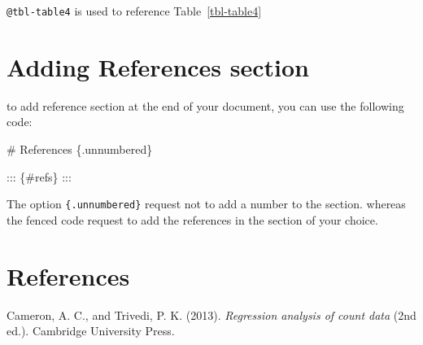 \documentclass[
  11pts,
]{article}
\newenvironment{Shaded}{\begin{snugshade}}{\end{snugshade}}
\newcommand{\FunctionTok}[1]{\textcolor[rgb]{0.28,0.35,0.67}{#1}}
\newcommand{\NormalTok}[1]{\textcolor[rgb]{0.00,0.23,0.31}{#1}}
\newlength{\cslhangindent}
\newenvironment{CSLReferences}[2] %
 {\begin{list}{}{%
  \setlength{\itemindent}{0pt}
  \setlength{\leftmargin}{0pt}
  \setlength{\parsep}{0pt}
  \ifodd #1
   \setlength{\leftmargin}{\cslhangindent}
   \setlength{\itemindent}{-1\cslhangindent}
  \fi
  \setlength{\itemsep}{#2\baselineskip}}}
 {\end{list}}
\begin{document}
\begin{table}[H]

\caption{\label{tbl-table4}Table using Latex code}


\end{table}%

\texttt{@tbl-table4} is used to reference Table~\ref{tbl-table4}

\section{Adding References section}\label{adding-references-section}

to add reference section at the end of your document, you can use the
following code:

\begin{Shaded}
\begin{Highlighting}[]
\FunctionTok{\# References \{.unnumbered\}}

\NormalTok{::: \{\#refs\}}
\NormalTok{:::}
\end{Highlighting}
\end{Shaded}

The option \texttt{\{.unnumbered\}} request not to add a number to the
section. whereas the fenced code request to add the references in the
section of your choice.

\section*{References}\label{references}

\label{refs}
\begin{CSLReferences}{1}{0}
Cameron, A. C., and Trivedi, P. K. (2013). \emph{Regression analysis of
count data} (2nd ed.). Cambridge University Press.

\end{CSLReferences}
\end{document}
